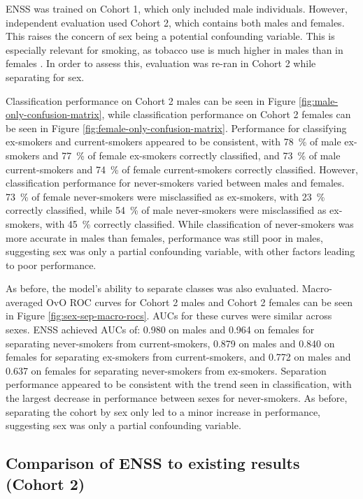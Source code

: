 \documentclass{article} %
\begin{document}
ENSS was trained on Cohort 1, which only included male individuals. However, independent evaluation used Cohort 2, which contains both males and females. This raises the concern of sex being a potential confounding variable. This is especially relevant for smoking, as tobacco use is much higher in males than in females \cite{WHO2021Tobacco, higgins2015literature}. In order to assess this, evaluation was re-ran in Cohort 2 while separating for sex.

Classification performance on Cohort 2 males can be seen in Figure \ref{fig:male-only-confusion-matrix}, while classification performance on Cohort 2 females can be seen in Figure \ref{fig:female-only-confusion-matrix}. Performance for classifying ex-smokers and current-smokers appeared to be consistent, with \SI{78}{\percent} of male ex-smokers and \SI{77}{\percent} of female ex-smokers correctly classified, and \SI{73}{\percent} of male current-smokers and \SI{74}{\percent} of female current-smokers correctly classified. However, classification performance for never-smokers varied between males and females. \SI{73}{\percent} of female never-smokers were misclassified as ex-smokers, with \SI{23}{\percent} correctly classified, while \SI{54}{\percent} of male never-smokers were misclassified as ex-smokers, with \SI{45}{\percent} correctly classified. While classification of never-smokers was more accurate in males than females, performance was still poor in males, suggesting sex was only a partial confounding variable, with other factors leading to poor performance.

As before, the model's ability to separate classes was also evaluated. Macro-averaged OvO ROC curves for Cohort 2 males and Cohort 2 females can be seen in Figure \ref{fig:sex-sep-macro-rocs}. AUCs for these curves were similar across sexes.
ENSS achieved AUCs of: 0.980 on males and 0.964 on females for separating never-smokers from current-smokers, 0.879 on males and 0.840 on females for separating ex-smokers from current-smokers, and 0.772 on males and 0.637 on females for separating never-smokers from ex-smokers. Separation performance appeared to be consistent with the trend seen in classification, with the largest decrease in performance between sexes for never-smokers. As before, separating the cohort by sex only led to a minor increase in performance, suggesting sex was only a partial confounding variable.

\subsection{Comparison of ENSS to existing results (Cohort 2)} \label{sec:model-comparisons}
\end{document}
